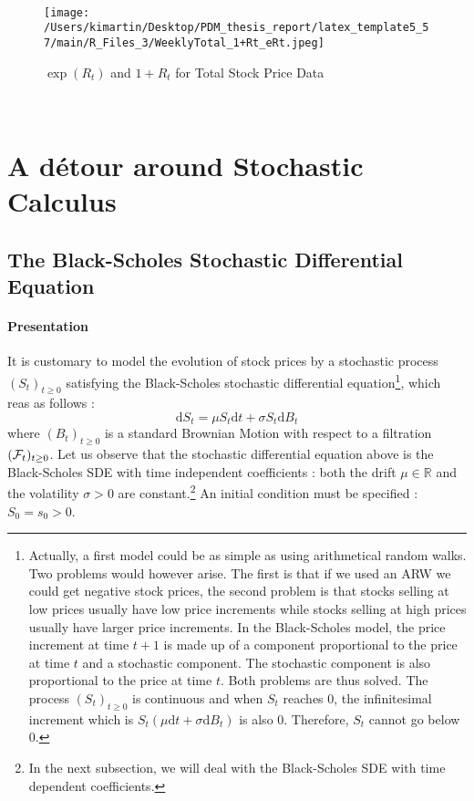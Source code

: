 \\
\begin{figure}[h!]
	\centering
	\begin{minipage}[b]{0.4\textwidth}
		\centering
		\texttt{[image: /Users/kimartin/Desktop/PDM\_thesis\_report/latex\_template5\_57/main/R\_Files\_3/WeeklyTotal\_1+Rt\_eRt.jpeg]}
		\caption{$\exp(R_t)$ and $1 + R_t$ for Total Stock Price Data}
		\label{fig:TotalCompApproxStock}
	\end{minipage}
\end{figure}
\\


\section{A détour around Stochastic Calculus}
\subsection{The Black-Scholes Stochastic Differential Equation}
\paragraph{Presentation}
It is customary to model the evolution of stock prices by a stochastic process $(S_t)_{t \ge 0}$ satisfying the Black-Scholes stochastic differential equation\footnote{Actually, a first model could be as simple as using arithmetical random walks. Two problems would however arise. The first is that if we used an ARW we could get negative stock prices, the second problem is that stocks selling at low prices usually have low price increments while stocks selling at high prices usually have larger price increments. In the Black-Scholes model, the price increment at time $t+1$ is made up of a component proportional to the price at time $t$ and a stochastic component. The stochastic component is also proportional to the price at time $t$. Both problems are thus solved. The process $(S_t)_{t \ge 0}$ is continuous and when $S_t$ reaches $0$, the infinitesimal increment which is $S_t (\mu \mathrm{d}t + \sigma \mathrm{d}B_t )$ is also $0$. Therefore, $S_t$ cannot go below $0$.}, which reas as follows : 
\begin{equation}
\mathrm{d}S_t = \mu S_t \mathrm{d}t + \sigma S_t \mathrm{d}B_t
\end{equation}
where $(B_t)_{t \ge 0}$ is a standard Brownian Motion with respect to a filtration $({\cal{F}}_t)_{t \ge 0}$. Let us observe that the stochastic differential equation above is the Black-Scholes SDE with time independent coefficients : both the drift $\mu \in \mathbb{R}$ and the volatility $\sigma > 0$ are constant.\footnote{In the next subsection, we will deal with the Black-Scholes SDE with time dependent coefficients.} An initial condition must be specified : $S_0 = s_0 > 0$.
